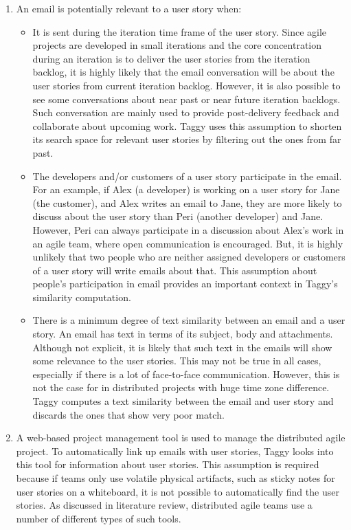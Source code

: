 \begin{enumerate}
	\item An email is potentially relevant to a user story when:
		\begin{itemize}
			\item It is sent during the iteration time frame of the user story. Since agile projects are developed in small iterations and the core concentration during an iteration is to deliver the user stories from the iteration backlog, it is highly likely that the email conversation will be about the user stories from current iteration backlog. However, it is also possible to see some conversations about near past or near future iteration backlogs. Such conversation are mainly used to provide post-delivery feedback and collaborate about upcoming work. Taggy uses this assumption to shorten its search space for relevant user stories by filtering out the ones from far past.
			
			\item The developers and/or customers of a user story participate in the email. For an example, if Alex (a developer) is working on a user story for Jane (the customer), and Alex writes an email to Jane, they are more likely to discuss about the user story than Peri (another developer) and Jane. However, Peri can always participate in a discussion about Alex's work in an agile team, where open communication is encouraged. But, it is highly unlikely that two people who are neither assigned developers or customers of a user story will write emails about that. This assumption about people's participation in email provides an important context in Taggy's similarity computation.
			
			\item There is a minimum degree of text similarity between an email and a user story. An email has text in terms of its subject, body and attachments. Although not explicit, it is likely that such text in the emails will show some relevance to the user stories. This may not be true in all cases, especially if there is a lot of face-to-face communication. However, this is not the case for in distributed projects with huge time zone difference. Taggy computes a text similarity between the email and user story and discards the ones that show very poor match.
		\end{itemize}
	 \item A web-based project management tool is used to manage the distributed agile project. To automatically link up emails with user stories, Taggy looks into this tool for information about user stories. This assumption is required because if teams only use volatile physical artifacts, such as sticky notes for user stories on a whiteboard, it is not possible to automatically find the user stories. As discussed in literature review, distributed agile teams use a number of different types of such tools.
	

\end{enumerate}

